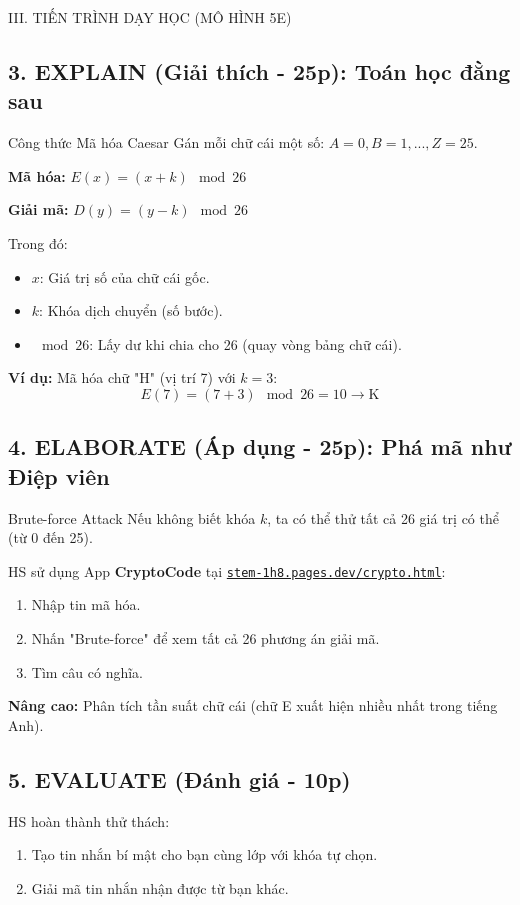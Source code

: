 \documentclass[12pt,a4paper]{article}
\begin{document}
\begin{sectionbox}{III. TIẾN TRÌNH DẠY HỌC (MÔ HÌNH 5E)}
\subsection*{3. EXPLAIN (Giải thích - 25p): Toán học đằng sau}
\begin{mathbox}{Công thức Mã hóa Caesar}
Gán mỗi chữ cái một số: $A=0, B=1, ..., Z=25$.

\textbf{Mã hóa:} $E(x) = (x + k) \mod 26$

\textbf{Giải mã:} $D(y) = (y - k) \mod 26$

Trong đó:
\begin{itemize}
    \item $x$: Giá trị số của chữ cái gốc.
    \item $k$: Khóa dịch chuyển (số bước).
    \item $\mod 26$: Lấy dư khi chia cho 26 (quay vòng bảng chữ cái).
\end{itemize}

\textbf{Ví dụ:} Mã hóa chữ "H" (vị trí 7) với $k=3$:
$$ E(7) = (7 + 3) \mod 26 = 10 \to \text{K} $$
\end{mathbox}

\subsection*{4. ELABORATE (Áp dụng - 25p): Phá mã như Điệp viên}
\begin{activitybox}{Brute-force Attack}
Nếu không biết khóa $k$, ta có thể thử tất cả 26 giá trị có thể (từ 0 đến 25).

HS sử dụng App \textbf{CryptoCode} tại \href{https://stem-1h8.pages.dev/crypto.html}{\texttt{stem-1h8.pages.dev/crypto.html}}:
\begin{enumerate}
    \item Nhập tin mã hóa.
    \item Nhấn "Brute-force" để xem tất cả 26 phương án giải mã.
    \item Tìm câu có nghĩa.
\end{enumerate}

\textbf{Nâng cao:} Phân tích tần suất chữ cái (chữ E xuất hiện nhiều nhất trong tiếng Anh).
\end{activitybox}

\subsection*{5. EVALUATE (Đánh giá - 10p)}
HS hoàn thành thử thách:
\begin{enumerate}
    \item Tạo tin nhắn bí mật cho bạn cùng lớp với khóa tự chọn.
    \item Giải mã tin nhắn nhận được từ bạn khác.
\end{enumerate}
\end{sectionbox}
\end{document}
